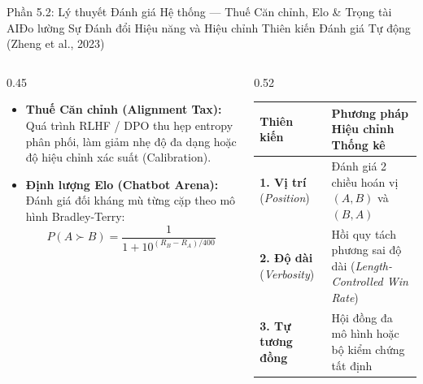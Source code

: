 \begin{frame}{Phần 5.2: Lý thuyết Đánh giá Hệ thống --- Thuế Căn chỉnh, Elo \& Trọng tài AI}{Đo lường Sự Đánh đổi Hiệu năng và Hiệu chỉnh Thiên kiến Đánh giá Tự động (Zheng et al., 2023)}
  \begin{columns}[T,onlytextwidth]
    \begin{column}{0.45\textwidth}
      \scriptsize
      \begin{itemize}\setlength{\itemsep}{4pt}
        \item \textbf{Thuế Căn chỉnh (Alignment Tax):}\\
          Quá trình RLHF / DPO thu hẹp entropy phân phối, làm giảm nhẹ độ đa dạng hoặc độ hiệu chỉnh xác suất (Calibration).
        \item \textbf{Định lượng Elo (Chatbot Arena):}\\
          Đánh giá đối kháng mù từng cặp theo mô hình Bradley-Terry:
          \[
            P(A \succ B) = \frac{1}{1 + 10^{(R_B - R_A)/400}}
          \]
      \end{itemize}
    \end{column}
    \begin{column}{0.52\textwidth}
      \scriptsize
      \renewcommand{\arraystretch}{1.22}
      \begin{tabularx}{\textwidth}{@{}l X@{}}
        \toprule
        \textbf{Thiên kiến} & \textbf{Phương pháp Hiệu chỉnh Thống kê} \\
        \midrule
        \textbf{1. Vị trí} (\textit{Position}) & Đánh giá 2 chiều hoán vị $(A, B)$ và $(B, A)$ \\
        \hline
        \textbf{2. Độ dài} (\textit{Verbosity}) & Hồi quy tách phương sai độ dài (\textit{Length-Controlled Win Rate}) \\
        \hline
        \textbf{3. Tự tương đồng} & Hội đồng đa mô hình hoặc bộ kiểm chứng tất định \\
        \bottomrule
      \end{tabularx}
    \end{column}
  \end{columns}
\end{frame}

